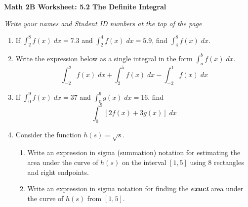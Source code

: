 \documentclass[12pt,fleqn]{article}
\begin{document}
\begin{center}
	\textbf{Math 2B Worksheet: 5.2 The Definite Integral}
\end{center}

\emph{Write your names and Student ID numbers at the top of the page}


\begin{enumerate}
	\item If $\int_2^8f(x)\;dx=7.3$ and $\int_2^4f(x)\;dx=5.9$, find $\int_4^8f(x)\;dx$.\\[150pt]


	\item Write the expression below as a single integral in the form $\int_a^bf(x)\;dx$.
	\[\int_{-2}^2f(x)\;dx+\int_2^5f(x)\;dx-\int_{-2}^1f(x)\;dx\]
	
	\vspace{150pt}

	\item If $\int_0^9f(x)\;dx=37$ and $\int_0^9g(x)\;dx=16$, find
	\[\int_0^9[2f(x)+3g(x)]\;dx\]
	
	\newpage
	

	\item Consider the function $h(s)=\sqrt{s}$.  
	\begin{enumerate}
		\item Write an expression in sigma (summation) notation for estimating the area under the curve of $h(s)$ on the interval $[1,5]$ using 8 rectangles and right endpoints.\\[200pt]

	\item Write an expression in sigma notation for finding the \textbf{\textit{exact}} area under the curve of $h(s)$ from $[1,5]$.  
\end{enumerate}

\end{enumerate}
\end{document}
